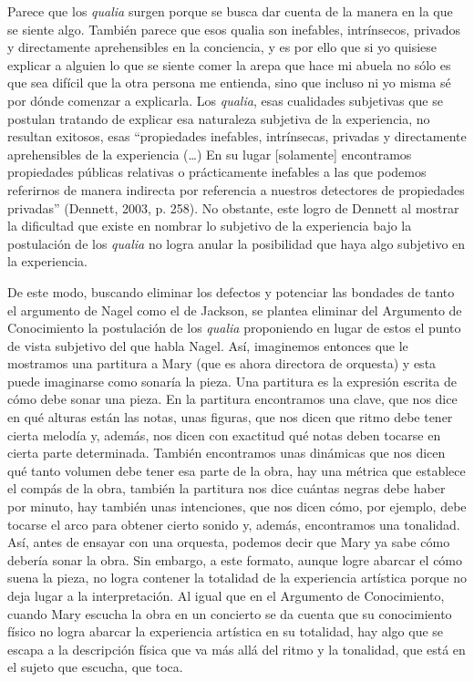 \documentclass[]{book}
\begin{document}
Parece que los \emph{qualia} surgen porque se busca dar cuenta de la
manera en la que se siente algo. También parece que esos qualia son
inefables, intrínsecos, privados y directamente aprehensibles en la
conciencia, y es por ello que si yo quisiese explicar a alguien lo que
se siente comer la arepa que hace mi abuela no sólo es que sea difícil
que la otra persona me entienda, sino que incluso ni yo misma sé por
dónde comenzar a explicarla. Los \emph{qualia}, esas cualidades
subjetivas que se postulan tratando de explicar esa naturaleza subjetiva
de la experiencia, no resultan exitosos, esas ``propiedades inefables,
intrínsecas, privadas y directamente aprehensibles de la experiencia
(\ldots{}) En su lugar {[}solamente{]} encontramos propiedades públicas
relativas o prácticamente inefables a las que podemos referirnos de
manera indirecta por referencia a nuestros detectores de propiedades
privadas'' (Dennett, 2003, p. 258). No obstante, este logro de Dennett
al mostrar la dificultad que existe en nombrar lo subjetivo de la
experiencia bajo la postulación de los \emph{qualia} no logra anular la
posibilidad que haya algo subjetivo en la experiencia.

De este modo, buscando eliminar los defectos y potenciar las bondades de
tanto el argumento de Nagel como el de Jackson, se plantea eliminar del
Argumento de Conocimiento la postulación de los \emph{qualia}
proponiendo en lugar de estos el punto de vista subjetivo del que habla
Nagel. Así, imaginemos entonces que le mostramos una partitura a Mary
(que es ahora directora de orquesta) y esta puede imaginarse como
sonaría la pieza. Una partitura es la expresión escrita de cómo debe
sonar una pieza. En la partitura encontramos una clave, que nos dice en
qué alturas están las notas, unas figuras, que nos dicen que ritmo debe
tener cierta melodía y, además, nos dicen con exactitud qué notas deben
tocarse en cierta parte determinada. También encontramos unas dinámicas
que nos dicen qué tanto volumen debe tener esa parte de la obra, hay una
métrica que establece el compás de la obra, también la partitura nos
dice cuántas negras debe haber por minuto, hay también unas intenciones,
que nos dicen cómo, por ejemplo, debe tocarse el arco para obtener
cierto sonido y, además, encontramos una tonalidad. Así, antes de
ensayar con una orquesta, podemos decir que Mary ya sabe cómo debería
sonar la obra. Sin embargo, a este formato, aunque logre abarcar el cómo
suena la pieza, no logra contener la totalidad de la experiencia
artística porque no deja lugar a la interpretación. Al igual que en el
Argumento de Conocimiento, cuando Mary escucha la obra en un concierto
se da cuenta que su conocimiento físico no logra abarcar la experiencia
artística en su totalidad, hay algo que se escapa a la descripción
física que va más allá del ritmo y la tonalidad, que está en el sujeto
que escucha, que toca.
\end{document}
